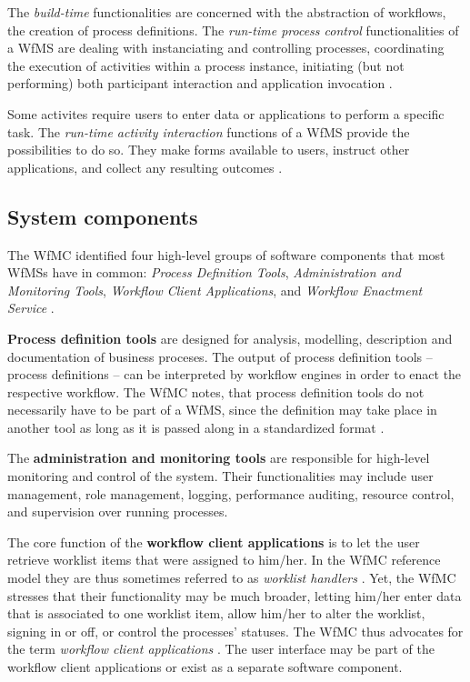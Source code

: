     The \emph{build-time} functionalities are concerned with the abstraction of workflows, \ie the creation of process definitions.
    The \emph{run-time process control} functionalities of a \ac{WfMS} are dealing with instanciating and controlling processes, coordinating the execution of activities within a process instance, initiating (but not performing) both participant interaction and application invocation \cite{Hollingsworth1995Wfmc}.

    Some activites require users to enter data or applications to perform a specific task. The \emph{run-time activity interaction} functions of a \ac{WfMS} provide the possibilities to do so. They make forms available to users, instruct other applications, and collect any resulting outcomes \cite{Hollingsworth1995Wfmc}.

  \subsection{System components} %
  \label{sub:system_components}

    The \ac{WfMC} identified four high-level groups of software components that most \acp{WfMS} have in common: \emph{Process Definition Tools}, \emph{Administration and Monitoring Tools}, \emph{Workflow Client Applications}, and \emph{Workflow Enactment Service} \cite{Hollingsworth1995Wfmc}.

    \textbf{Process definition tools} are designed for analysis, modelling, description and documentation of business proceses. The output of process definition tools -- process definitions -- can be interpreted by workflow engines in order to enact the respective workflow. The \ac{WfMC} notes, that process definition tools do not necessarily have to be part of a \ac{WfMS}, since the definition may take place in another tool as long as it is passed along in a standardized format \cite{Hollingsworth1995Wfmc}.

    The \textbf{administration and monitoring tools} are responsible for high-level monitoring and control of the system. Their functionalities may include user management, role management, logging, performance auditing, resource control, and supervision over running processes.

    The core function of the \textbf{workflow client applications} is to let the user retrieve worklist items that were assigned to him/her. In the \ac{WfMC} reference model they are thus sometimes referred to as \emph{worklist handlers} \cite{Hollingsworth1995Wfmc}.
    Yet, the \ac{WfMC} stresses that their functionality may be much broader, \eg letting him/her enter data that is associated to one worklist item, allow him/her to alter the worklist, signing in or off, or control the processes' statuses. The \ac{WfMC} thus advocates for the term \emph{workflow client applications} \cite{Hollingsworth1995Wfmc}.
    The user interface may be part of the workflow client applications or exist as a separate software component.

